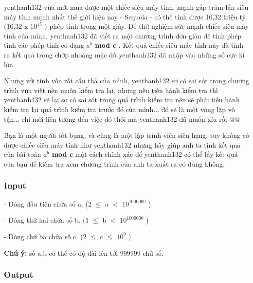 



yenthanh132     vừa mới mua được một chiếc siêu máy tính, mạnh gấp trăm lần siêu máy tính mạnh nhất thế giới hiện nay - Sequoia - có thể tính được 16,32 triệu tỷ (16,32 x $10^{15}$     ) phép tính trong một giây. Để thử nghiệm sức mạnh chiếc siêu máy tính của mình,    yenthanh132     đã viết ra một chương trình đơn giản để tính phép tính các phép tính có dạng    \textbf{      $a^{b}$      mod c     }\textbf{      .     }\textbf{}     Kết quả chiếc siêu máy tính này đã tính ra kết quả trong chớp nhoáng mặc dù    yenthanh132     đã nhập vào những số cực kì lớn.    



     Nhưng với tính vốn rất cẩu thả của mình,    yenthanh132     sợ có sai sót trong chương trình vừa viết nên muốn kiểm tra lại, nhưng nếu tiến hành kiểm tra thì    yenthanh132     sẽ lại sợ có sai sót trong quá trình kiểm tra nên sẽ phải tiến hành kiểm tra lại quá trình kiểm tra trước đó của mình... đó sẽ là một vòng lặp vô tận... chỉ mới liên tưởng đến việc đó thôi mà    yenthanh132     đã muốn xỉu rồi @@    



     Bạn là một người tốt bụng, và cũng là một lập trình viên siêu hạng, tuy không có được chiếc siêu máy tính như    yenthanh132     nhưng hãy giúp anh ta tính kết quả của bài toán    \textbf{      $a^{b}$      mod c     }     một cách chính xác để    yenthanh132     có thể lấy kết quả của bạn để kiểm tra xem chương trình của anh ta xuất ra có đúng không.    

\subsubsection{   Input  }

    - Dòng đầu tiên chứa số a. (2  $\le$  a $<$ $10^{1000000}$    )   



    - Dòng thứ hai chứa số b. (1  $\le$  b $<$ $10^{1000000}$    )   



    - Dòng chứ ba chứa số c. (2 $\le$ c $\le$ $10^{9}$    )   



\textbf{     Chú ý:    }    số a,b có thể có độ dài lên tới 999999 chữ số.   

\subsubsection{   Output  }


